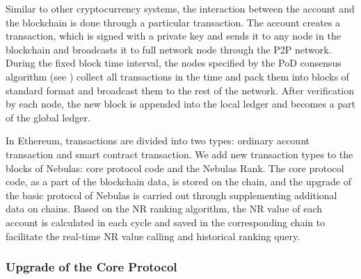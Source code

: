 Similar to other cryptocurrency systems, the interaction between the account and the blockchain is done through a particular transaction. The account creates a transaction, which is signed with a private key and sends it to any node in the blockchain and broadcasts it to full network node through the P2P network. During the fixed block time interval, the nodes specified by the PoD consensus algorithm (see ) collect all transactions in the time and pack them into blocks of standard format and broadcast them to the rest of the network. After verification by each node, the new block is appended into the local ledger and becomes a part of the global ledger.


In Ethereum, transactions are divided into two types: ordinary account transaction and smart contract transaction. We add new transaction types to the blocks of Nebulas: core protocol code and the Nebulas Rank. The core protocol code, as a part of the blockchain data, is stored on the chain, and the upgrade of the basic protocol of Nebulas is carried out through supplementing additional data on chains. Based on the NR ranking algorithm, the NR value of each account is calculated in each cycle and saved in the corresponding chain to facilitate the real-time NR value calling and historical ranking query.


\subsubsection{Upgrade of the Core Protocol}

